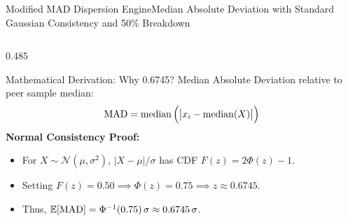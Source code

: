 \begin{frame}{Modified MAD Dispersion Engine}{Median Absolute Deviation with Standard Gaussian Consistency and 50\% Breakdown}
    \vspace{-0.20cm}
    \begin{columns}[T,onlytextwidth]
        \begin{column}{0.485\textwidth}
            \begin{mathcard}[height=2.74cm]{Mathematical Derivation: Why 0.6745?}
                \fontsize{5.7pt}{6.9pt}\selectfont
                Median Absolute Deviation relative to peer sample median:
                \begin{equation*}
                    \textstyle \operatorname{MAD} = \operatorname{median}\Big(\big|x_i - \operatorname{median}(X)\big|\Big)
                \end{equation*}
                \textbf{\color{deepemerald}Normal Consistency Proof:}
                \begin{itemize}
                    \setlength{\itemsep}{1pt}
                    \item For $X \sim \mathcal{N}(\mu, \sigma^2)$, $|X - \mu|/\sigma$ has CDF $F(z) = 2\Phi(z) - 1$.
                    \item Setting $F(z) = 0.50 \implies \Phi(z) = 0.75 \implies z \approx 0.6745$.
                    \item Thus, $\mathbb{E}[\operatorname{MAD}] = \Phi^{-1}(0.75)\,\sigma \approx 0.6745\,\sigma$.
                \end{itemize}
            \end{mathcard}

            \vspace{0.12cm}


\end{column}
\end{columns}
\end{frame}
